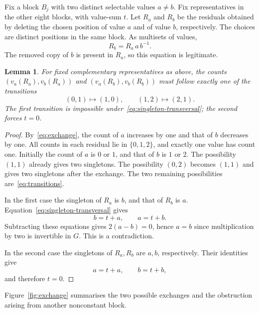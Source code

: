 \documentclass[11pt]{article}
\newtheorem{lemma}[theorem]{Lemma}
\theoremstyle{definition}
\theoremstyle{remark}
\begin{document}
Fix a block $B_j$ with two distinct selectable values $a\neq b$.
Fix representatives in the other eight blocks, with value-sum $t$.
Let $R_a$ and $R_b$ be the residuals obtained by deleting the chosen
position of value $a$ and of value $b$, respectively. The choices are
distinct positions in the same block. As multisets of values,
\begin{equation}\label{eq:exchange}
                         R_b=R_a\,a\,b^{-1}.
\end{equation}
The removed copy of $b$ is present in $R_a$, so this equation is legitimate.

\begin{lemma}\label{lem:exchange}
For fixed complementary representatives as above, the counts
$(v_a(R_a),v_b(R_a))$ and $(v_a(R_b),v_b(R_b))$ must follow exactly one
of the transitions
\begin{equation}\label{eq:transitions}
             (0,1)\longmapsto(1,0),\qquad
             (1,2)\longmapsto(2,1).
\end{equation}
The first transition is impossible under~\eqref{eq:singleton-transversal};
the second forces $t=0$.
\end{lemma}
\begin{proof}
By~\eqref{eq:exchange}, the count of $a$ increases by one and that of
$b$ decreases by one. All counts in each residual lie in $\{0,1,2\}$,
and exactly one value has count one. Initially the count of $a$ is
$0$ or $1$, and that of $b$ is $1$ or $2$.
The possibility $(1,1)$ already gives two singletons. The possibility
$(0,2)$ becomes $(1,1)$ and gives two singletons after the exchange.
The two remaining possibilities are~\eqref{eq:transitions}.

In the first case the singleton of $R_a$ is $b$, and that of $R_b$ is
$a$. Equation~\eqref{eq:singleton-transversal} gives
\[
                      b=t+a,\qquad a=t+b.
\]
Subtracting these equations gives $2(a-b)=0$, hence $a=b$ since
multiplication by two is invertible in $G$. This is a contradiction.

In the second case the singletons of $R_a,R_b$ are $a,b$, respectively.
Their identities give
\[
                     a=t+a,\qquad b=t+b,
\]
and therefore $t=0$.
\end{proof}

Figure~\ref{fig:exchange} summarises the two possible exchanges
and the obstruction arising from another nonconstant block.
\end{document}

